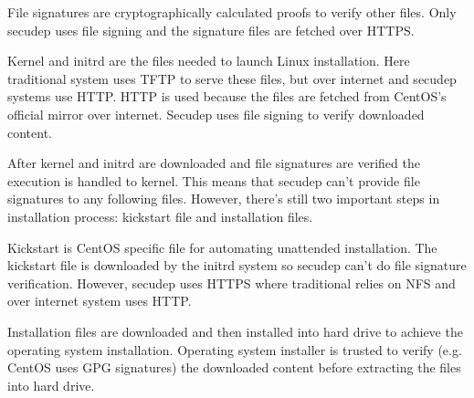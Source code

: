 File signatures are cryptographically calculated proofs to verify
other files. Only secudep uses file signing and the signature files
are fetched over HTTPS.

Kernel and initrd are the files needed to launch Linux
installation. Here traditional system uses TFTP to serve these files,
but over internet and secudep systems use HTTP. HTTP is used because
the files are fetched from CentOS's official mirror over
internet. Secudep uses file signing to verify downloaded content.

After kernel and initrd are downloaded and file signatures are
verified the execution is handled to kernel. This means that secudep
can't provide file signatures to any following files. However, there's
still two important steps in installation process: kickstart file and
installation files.

Kickstart is CentOS specific file for automating unattended
installation. The kickstart file is downloaded by the initrd system so
secudep can't do file signature verification. However, secudep uses
HTTPS where traditional relies on NFS and over internet system uses
HTTP.

Installation files are downloaded and then installed into hard drive
to achieve the operating system installation. Operating system
installer is trusted to verify (e.g. CentOS uses GPG signatures) the
downloaded content before extracting the files into hard drive.
